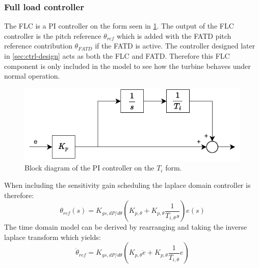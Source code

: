 \subsubsection{Full load controller} \label{sec:comp_flc}
The FLC is a PI controller on the form seen in \cref{fig:PIcontroller}. The output of the FLC controller is the pitch reference $ \theta_{ref} $ which is added with the FATD pitch reference contribution $ \theta_{FATD} $ if the FATD is active. The controller designed later in \cref{sec:ctrl-design} acts as both the FLC and FATD. Therefore this FLC component is only included in the model to see how the turbine behaves under normal operation.
\begin{figure}[ht]
	\centering
	\includegraphics[width=0.5\linewidth]{Graphics/PiController.pdf}
	\caption{Block diagram of the PI controller on the \textit{$T_i$} form.}
	\label{fig:PIcontroller}
\end{figure}
When including the sensitivity gain scheduling the laplace domain controller is therefore:
\begin{equation}\label{eq:comp_flc}
	\theta_{ref}(s) = K_{gs,dP/d\theta} (K_{p, \theta} + K_{p, \theta} \dfrac{1}{T_{i, \theta} s}) e(s)
\end{equation}
The time domain model can be derived by rearranging and taking the inverse laplace transform which yields:
\begin{equation}\label{eq:comp_flc_time}
	\dot{\theta}_{ref} = K_{gs,dP/d\theta} (K_{p, \theta} \dot{e} + K_{p, \theta} \dfrac{1}{T_{i, \theta}} e)
\end{equation}


